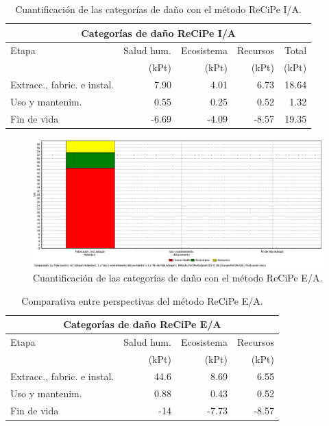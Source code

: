 \begin{table}[!htb]
\centering
\begin{tabular}{p{6cm}rrrr}
\toprule
\multicolumn{5}{c}{Categorías de daño ReCiPe I/A}\\
\midrule
Etapa & Salud hum. & Ecosistema & Recursos & Total\\
 & (kPt) & (kPt) & (kPt) & (kPt)\\
\midrule
Extracc., fabric. e instal. & 7.90 & 4.01 & 6.73 & 18.64\\
Uso y mantenim. & 0.55 & 0.25 & 0.52 & 1.32\\
Fin de vida & -6.69 & -4.09 & -8.57 & 19.35\\
\bottomrule
\end{tabular}
\caption{Cuantificación de las categorías de daño con el método ReCiPe I/A.}
\label{sensibilidad_ia_puntuacionunica}
\end{table}

\begin{figure}[!htb]
\centering
\includegraphics[width=15cm]{img/sensibilidad_ea_puntuacionunica.png}
\caption{Cuantificación de las categorías de daño con el método ReCiPe E/A.}
\label{fig:sensibilidad_ea_puntuacionunica}
\end{figure}

\begin{table}[!htb]
\centering
\begin{tabular}{p{6cm}rrr}
\toprule
\multicolumn{4}{c}{Categorías de daño ReCiPe E/A}\\
\midrule
Etapa & Salud hum. & Ecosistema & Recursos\\
 & (kPt) & (kPt) & (kPt)\\
\midrule
Extracc., fabric. e instal. & 44.6 & 8.69 & 6.55\\
Uso y mantenim. & 0.88 & 0.43 & 0.52\\
Fin de vida & -14 & -7.73 & -8.57\\
\bottomrule
\end{tabular}
\caption{Comparativa entre perspectivas del método ReCiPe E/A.}
\label{ensibilidad_ea_puntuacionunica}
\end{table}

